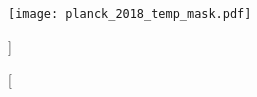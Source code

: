 \begin{figure}[htpb]
	\centering\capstart{}
	\texttt{[image: planck\_2018\_temp\_mask.pdf]}
	\caption[

	]{

	}\label{fig:chapter2_planck_unmasked}
\end{figure}
